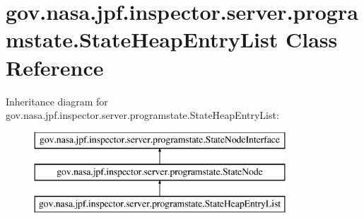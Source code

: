 \hypertarget{classgov_1_1nasa_1_1jpf_1_1inspector_1_1server_1_1programstate_1_1_state_heap_entry_list}{}\section{gov.\+nasa.\+jpf.\+inspector.\+server.\+programstate.\+State\+Heap\+Entry\+List Class Reference}
\label{classgov_1_1nasa_1_1jpf_1_1inspector_1_1server_1_1programstate_1_1_state_heap_entry_list}
Inheritance diagram for gov.\+nasa.\+jpf.\+inspector.\+server.\+programstate.\+State\+Heap\+Entry\+List\+:\begin{figure}[H]
\begin{center}
\leavevmode
\includegraphics[height=3.000000cm]{classgov_1_1nasa_1_1jpf_1_1inspector_1_1server_1_1programstate_1_1_state_heap_entry_list}
\end{center}
\end{figure}

